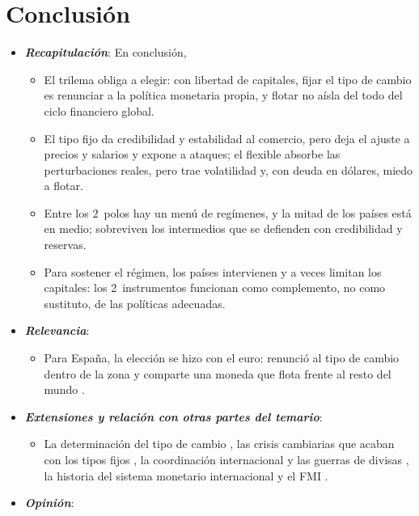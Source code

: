 \documentclass[11pt]{article}
\begin{document}
\section*{Conclusión}

\begin{itemize}
\item \textbf{\emph{Recapitulación}}: En conclusión,
  \begin{itemize}
  \item El trilema obliga a elegir: con libertad de capitales, fijar el tipo de cambio es renunciar a la política monetaria propia, y flotar no aísla del todo del ciclo financiero global.
  \item El tipo fijo da credibilidad y estabilidad al comercio, pero deja el ajuste a precios y salarios y expone a ataques; el flexible absorbe las perturbaciones reales, pero trae volatilidad y, con deuda en dólares, miedo a flotar.
  \item Entre los 2~polos hay un menú de regímenes, y la mitad de los países está en medio; sobreviven los intermedios que se defienden con credibilidad y reservas.
  \item Para sostener el régimen, los países intervienen y a veces limitan los capitales: los 2~instrumentos funcionan como complemento, no como sustituto, de las políticas adecuadas.
  \end{itemize}
\item \textbf{\emph{Relevancia}}:
  \begin{itemize}
  \item Para España, la elección se hizo con el euro: renunció al tipo de cambio dentro de la zona y comparte una moneda que flota frente al resto del mundo  .
  \end{itemize}
\item \textbf{\emph{Extensiones y relación con otras partes del temario}}:
  \begin{itemize}
  \item La determinación del tipo de cambio , las crisis cambiarias que acaban con los tipos fijos , la coordinación internacional y las guerras de divisas , la historia del sistema monetario internacional   y el FMI .
  \end{itemize}
\item \textbf{\emph{Opinión}}:
  \begin{itemize}

\end{itemize}
\end{itemize}
\end{document}
